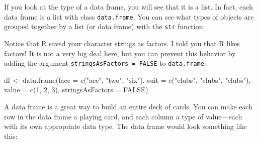 \documentclass[
  letterpaper,
  DIV=11,
  numbers=noendperiod]{scrbook}
\newenvironment{Shaded}{\begin{snugshade}}{\end{snugshade}}
\newcommand{\AttributeTok}[1]{\textcolor[rgb]{0.40,0.45,0.13}{#1}}
\newcommand{\ConstantTok}[1]{\textcolor[rgb]{0.56,0.35,0.01}{#1}}
\newcommand{\DecValTok}[1]{\textcolor[rgb]{0.68,0.00,0.00}{#1}}
\newcommand{\DocumentationTok}[1]{\textcolor[rgb]{0.37,0.37,0.37}{\textit{#1}}}
\newcommand{\FunctionTok}[1]{\textcolor[rgb]{0.28,0.35,0.67}{#1}}
\newcommand{\NormalTok}[1]{\textcolor[rgb]{0.00,0.23,0.31}{#1}}
\newcommand{\OtherTok}[1]{\textcolor[rgb]{0.00,0.23,0.31}{#1}}
\newcommand{\StringTok}[1]{\textcolor[rgb]{0.13,0.47,0.30}{#1}}
\begin{document}
If you look at the type of a data frame, you will see that it is a list.
In fact, each data frame is a list with class \texttt{data.frame}. You
can see what types of objects are grouped together by a list (or data
frame) with the \texttt{str} function:

\begin{Shaded}
\end{Shaded}

Notice that R saved your character strings as factors. I told you that R
likes factors! It is not a very big deal here, but you can prevent this
behavior by adding the argument \texttt{stringsAsFactors\ =\ FALSE} to
\texttt{data.frame}:

\begin{Shaded}
\begin{Highlighting}[]
\NormalTok{df }\OtherTok{\textless{}{-}} \FunctionTok{data.frame}\NormalTok{(}\AttributeTok{face =} \FunctionTok{c}\NormalTok{(}\StringTok{"ace"}\NormalTok{, }\StringTok{"two"}\NormalTok{, }\StringTok{"six"}\NormalTok{),  }
  \AttributeTok{suit =} \FunctionTok{c}\NormalTok{(}\StringTok{"clubs"}\NormalTok{, }\StringTok{"clubs"}\NormalTok{, }\StringTok{"clubs"}\NormalTok{), }\AttributeTok{value =} \FunctionTok{c}\NormalTok{(}\DecValTok{1}\NormalTok{, }\DecValTok{2}\NormalTok{, }\DecValTok{3}\NormalTok{),}
  \AttributeTok{stringsAsFactors =} \ConstantTok{FALSE}\NormalTok{)}
\end{Highlighting}
\end{Shaded}

A data frame is a great way to build an entire deck of cards. You can
make each row in the data frame a playing card, and each column a type
of value---each with its own appropriate data type. The data frame would
look something like this:
\end{document}
